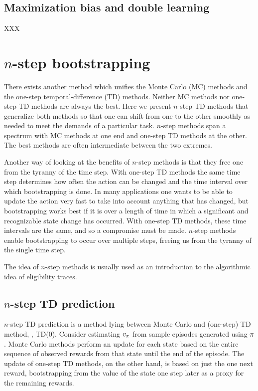 \subsection{Maximization bias and double learning}

XXX

\section{$n$-step bootstrapping}

There exists another method which unifies
the Monte Carlo (MC) methods and the one-step temporal-difference (TD) methods.
Neither MC methods nor one-step TD methods are always the best.
Here we present $n$-step TD methods that generalize both methods
so that one can shift from one to the other smoothly as needed to meet the demands of a particular task.
$n$-step methods span a spectrum with MC methods at one end and one-step TD methods at the other.
The best methods are often intermediate between the two extremes.

Another way of looking at the benefits of $n$-step methods is
that they free one from the tyranny of the time step.
With one-step TD methods the same time step determines how often the action can be changed
and the time interval over which bootstrapping is done.
In many applications one wants to be able to update the action very fast
to take into account anything that has changed,
but bootstrapping works best if it is over a length of time in which a significant and recognizable state change has occurred.
With one-step TD methods,
these time intervals are the same,
and so a compromise must be made.
$n$-step methods enable bootstrapping to occur over multiple steps,
freeing us from the tyranny of the single time step.

The idea of $n$-step methods is usually used as an introduction to the algorithmic idea of eligibility traces.

\subsection{$n$-step TD prediction}

$n$-step TD prediction is a method lying between Monte Carlo and (one-step) TD method, \ie, TD(0).
Consider estimating $v_{\pi}$ from sample episodes generated using $\pi$.
Monte Carlo methods perform an update for each state based on the entire sequence of observed rewards
from that state until the end of the episode.
The update of one-step TD methods, on the other hand,
is based on just the one next reward,
bootstrapping from the value of the state one step later as a proxy for the remaining rewards.


